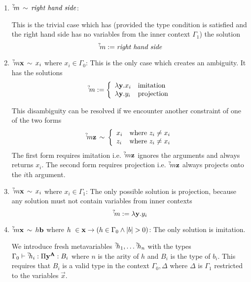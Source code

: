 \begin{enumerate}

    \item ${{}^? \kern-0.2em m} \,\sim\, \text{\emph{right hand side}}$:

        This is the trivial case which has (provided the type
        condition is satisfied and the right hand side has no variables from the
        inner context $\Gamma_1$) the solution
        $$
            {{}^? \kern-0.2em m} := \text{\emph{right hand side}}
        $$


    \item ${{}^? \kern-0.2em m} {\mathbf x} \,\sim\, x_i$ where $x_i \in \Gamma_0$:
        This is the
        only case which creates an ambiguity. It has the solutions
        $$
            {{}^? \kern-0.2em m} := \left\{ \begin{array}{lllll} 
                \lambda {\mathbf y}. x_i & \text{imitation}
                \\
                \lambda {\mathbf y}. y_i & \text{projection}
             \end{array} \right.
        $$

        This disambiguity can be resolved if we encounter another constraint of
        one of the two forms
        $$
            {{}^? \kern-0.2em m} {\mathbf z} \,\sim\,
            \left\{ \begin{array}{lllll} 
                x_i &\text{where } z_i \ne x_i
                \\
                z_i &\text{where } z_i \ne x_i
             \end{array} \right.
        $$
        The first form requires imitation i.e. ${{}^? \kern-0.2em m} {\mathbf z}$ ignores the
        arguments and always returns $x_i$. The second form requires projection
        i.e. ${{}^? \kern-0.2em m} {\mathbf z}$ always projects onto the $i$th argument.


    \item ${{}^? \kern-0.2em m} {\mathbf x} \,\sim\, x_i$ where $x_i \in \Gamma_1$: The only
        possible solution is projection, because any solution must not contain
        variables from inner contexts
        $$
            {{}^? \kern-0.2em m} := \lambda {\mathbf y} . y_i
        $$


    \item ${{}^? \kern-0.2em m} {\mathbf x} \,\sim\, h {\mathbf b}$ where $h \in \vec x \impl (h \in
        \Gamma_0 \land |b| > 0)$:
        The only solution is imitation.

        We introduce fresh metavariables ${{}^? \kern-0.2em h}_1, \ldots {{}^? \kern-0.2em h}_n$ with the
        types $\Gamma_0 \vdash {{}^? \kern-0.2em h}_i : \Pi {\mathbf y}^{{\mathbf A}} : B_i$ where $n$
        is the arity of $h$ and $B_i$ is the type of $b_i$. This requires that
        $B_i$ is a valid type in the context $\Gamma_0, \Delta$ where $\Delta$
        is $\Gamma_1$ restricted to the variables $\vec x$.


\end{enumerate}
